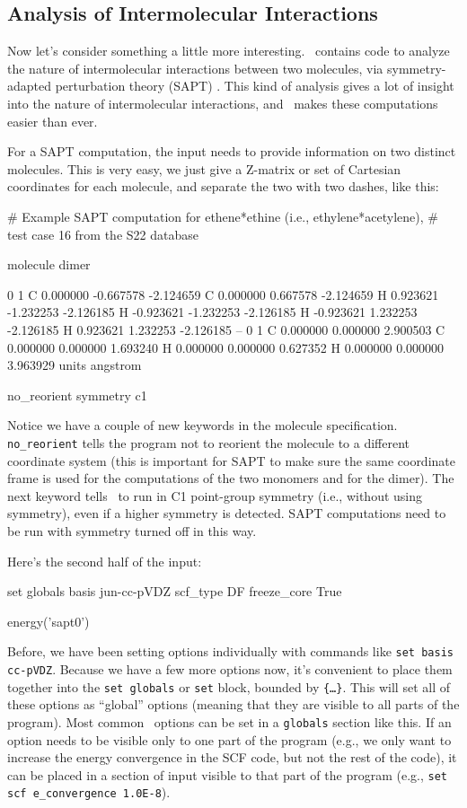 \subsection{Analysis of Intermolecular Interactions}
Now let's consider something a little more interesting.  \PSIfour\
contains code to analyze the nature of intermolecular interactions
between two molecules, via symmetry-adapted perturbation theory
(SAPT) \cite{Jeziorski:1994:1887}.  This kind of analysis gives a lot
of insight into the nature of intermolecular interactions, and \PSIfour\
makes these computations easier than ever.

For a SAPT computation, the input needs to provide information on two
distinct molecules.  This is very easy, we just give a Z-matrix or set of
Cartesian coordinates for each molecule, and separate the two with two
dashes, like this:
\begin{Snippet}
# Example SAPT computation for ethene*ethine (i.e., ethylene*acetylene),
# test case 16 from the S22 database

molecule dimer {
0 1
C   0.000000  -0.667578  -2.124659
C   0.000000   0.667578  -2.124659
H   0.923621  -1.232253  -2.126185
H  -0.923621  -1.232253  -2.126185
H  -0.923621   1.232253  -2.126185
H   0.923621   1.232253  -2.126185
--
0 1
C   0.000000   0.000000   2.900503
C   0.000000   0.000000   1.693240
H   0.000000   0.000000   0.627352
H   0.000000   0.000000   3.963929
units angstrom

no_reorient
symmetry c1
}
\end{Snippet}

Notice we have a couple of new keywords in the molecule specification.
{\tt no\_reorient} tells the program not to reorient the molecule
to a different coordinate system (this is important for SAPT to make
sure the same coordinate frame is used for the computations of the two
monomers and for the dimer).  The next keyword tells \PSIfour\ to run
in C1 point-group symmetry (i.e., without using symmetry), even if a
higher symmetry is detected.  SAPT computations need to be run with
symmetry turned off in this way.

Here's the second half of the input:
\begin{Snippet}
set globals {
    basis jun-cc-pVDZ
    scf_type DF
    freeze_core True
}

energy('sapt0')
\end{Snippet}

Before, we have been setting options individually with commands like 
{\tt set basis cc-pVDZ}.  Because we have a few more options now, it's
convenient to place them together into the {\tt set globals} or {\tt set}
block, bounded by {\tt \{\dots\}}.  This
will set all of these options as ``global'' options (meaning that they are
visible to all parts of the program).  Most common \PSIfour\ options can be
set in a {\tt globals} section like this.  If an option needs to be visible
only to one part of the program (e.g., we only want to increase the
energy convergence in the SCF code, but not the rest of the
code), it can be placed in a section of input visible to that part of the
program (e.g., {\tt set scf e\_convergence 1.0E-8}).

